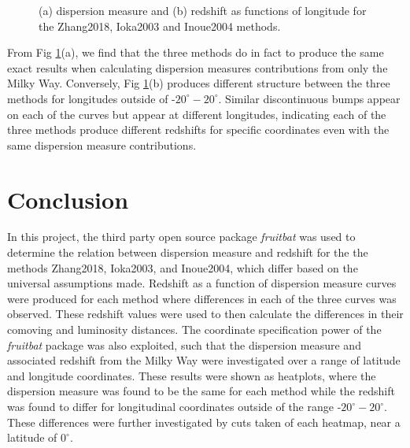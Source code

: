 \documentclass{article}
\begin{document}
\begin{figure}[!htb]
\centering
{}\hfill
{}
\caption{ (a) dispersion measure and (b) redshift as functions of longitude for the Zhang2018, Ioka2003 and Inoue2004 methods.}
\label{fig:heatplotcut}
\end{figure}

From Fig \ref{fig:heatplotcut}(a), we find that the three methods do in fact to produce the same exact results when calculating dispersion measures contributions from only the Milky Way. Conversely, Fig \ref{fig:heatplotcut}(b) produces different structure between the three methods for longitudes outside of -$20^\circ-20^\circ$. Similar discontinuous bumps appear on each of the curves but appear at different longitudes, indicating each of the three methods produce different redshifts for specific coordinates even with the same dispersion measure contributions.

\section{Conclusion}

In this project, the third party open source package \emph{fruitbat} was used to determine the relation between dispersion measure and redshift for the the methods Zhang2018, Ioka2003, and Inoue2004, which differ based on the universal assumptions made. Redshift as a function of dispersion measure curves were produced for each method where differences in each of the three curves was observed. These redshift values were used to then calculate the differences in their comoving and luminosity distances. The coordinate specification power of the \emph{fruitbat} package was also exploited, such that the dispersion measure and associated redshift from the Milky Way were investigated over a range of latitude and longitude coordinates. These results were shown as heatplots, where the dispersion measure was found to be the same for each method while the redshift was found to differ for longitudinal coordinates outside of the range -$20^\circ-20^\circ$. These differences were further investigated by cuts taken of each heatmap, near a latitude of $0^\circ$.



\end{document}
